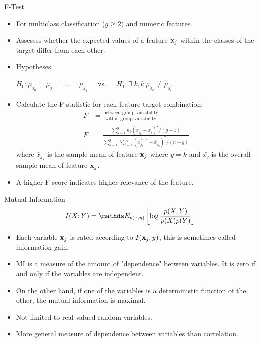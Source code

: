 \documentclass[11pt,compress,t,notes=noshow, xcolor=table]{beamer}
\begin{document}
  \begin{vbframe}{F-Test}
  \begin{itemize}
    \item For multiclass classification ($g \ge 2$) and numeric features.
    \item Assesses whether the expected values of a feature $\mathbf{x}_j$ within the classes of the target differ from each other.
    \item Hypotheses:

    $H_0: \mu_{j_0} = \mu_{j_1} = \dots = \mu_{j_g} \;\;\;\;$ vs. $\;\;\;\;H_1 : \exists \; k,l: \mu_{j_k} \neq \mu_{j_l}$
    \item Calculate the F-statistic for each feature-target combination:
    \begin{align*}
    F &= \frac{\text{between-group variability}}{\text{within-group variability}}\\
    F &= \frac{\sum_{k = 1}^g n_k (\bar{x}_{j_k} - \bar{x_j})^2/(g-1)}{\sum_{k = 1}^g \sum_{i = 1}^{n_k} (x_{j_k}^{(i)} - \bar{x}_{j_k})^2/(n-g)}
    \end{align*}
    where $\bar{x}_{j_k}$ is the sample mean of feature $\mathbf{x}_j$ where $y = k$ and $\bar{x_{j}}$ is the overall sample mean of feature $\mathbf{x}_j$.
  \item A higher F-score indicates higher relevance of the feature.
  \end{itemize}
  \end{vbframe}

  \begin{vbframe}{Mutual Information}
  $$I(X ; Y) = \E_{p(x, y)} \left[ \log \frac{p(X, Y)}{p(X) p(Y)} \right]$$

  \begin{itemize}
    \item Each variable $\mathbf{x}_j$ is rated according to $I(\mathbf{x}_j;y)$, this is sometimes called information gain.
    \item MI is a measure of the amount of "dependence" between variables. It is zero if and only if the variables are independent.
    \item On the other hand, if one of the variables is a deterministic function of the other, the mutual information is maximal.
  \item Not limited to real-valued random variables.
    \item More general measure of dependence between variables than correlation.
  \end{itemize}
  \end{vbframe}
\end{document}

